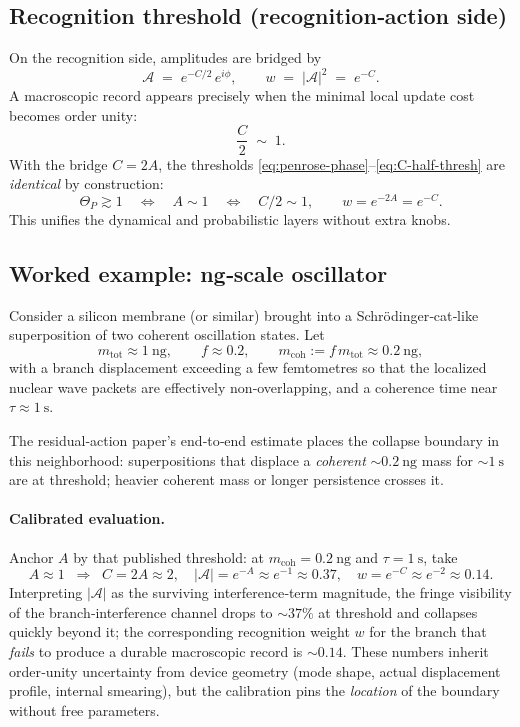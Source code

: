 \documentclass[11pt,letterpaper]{article}
\theoremstyle{definition}
\begin{document}
\subsection{Recognition threshold (recognition‑action side)}

On the recognition side, amplitudes are bridged by
\begin{equation}
\mathcal A \;=\;e^{-C/2}\,e^{i\phi},
\qquad 
w\;=\;|\mathcal A|^2\;=\;e^{-C}.
\end{equation}
A macroscopic record appears precisely when the minimal local update cost becomes order unity:
\begin{equation}
\frac{C}{2}\;\sim\;1.
\label{eq:C-half-thresh}
\end{equation}
With the bridge $C=2A$, the thresholds \eqref{eq:penrose-phase}--\eqref{eq:C-half-thresh} are \emph{identical} by construction:
\begin{equation}
\Theta_P\gtrsim 1 
\quad\Longleftrightarrow\quad 
A\sim 1
\quad\Longleftrightarrow\quad 
C/2\sim 1,
\qquad 
w=e^{-2A}=e^{-C}.
\end{equation}
This unifies the dynamical and probabilistic layers without extra knobs.

\subsection{Worked example: ng‑scale oscillator}

Consider a silicon membrane (or similar) brought into a Schr\"odinger‑cat‑like superposition of two coherent oscillation states. Let
\[
m_{\mathrm{tot}}\approx 1~\mathrm{ng},\qquad f\approx 0.2,\qquad 
m_{\mathrm{coh}}:=f\,m_{\mathrm{tot}}\approx 0.2~\mathrm{ng},
\]
with a branch displacement exceeding a few femtometres so that the localized nuclear wave packets are effectively non‑overlapping, and a coherence time near $\tau\approx 1~\mathrm{s}$.

The residual‑action paper’s end‑to‑end estimate places the collapse boundary in this neighborhood: superpositions that displace a \emph{coherent} $\sim 0.2~\mathrm{ng}$ mass for $\sim 1~\mathrm{s}$ are at threshold; heavier coherent mass or longer persistence crosses it. %
\paragraph{Calibrated evaluation.}
Anchor $A$ by that published threshold: at $m_{\mathrm{coh}}=0.2~\mathrm{ng}$ and $\tau=1~\mathrm{s}$, take
\[
A \approx 1\;\;\Rightarrow\;\; C=2A\approx 2,\quad 
|\mathcal A|=e^{-A}\approx e^{-1}\approx 0.37,\quad 
w=e^{-C}\approx e^{-2}\approx 0.14.
\]
Interpreting $|\mathcal A|$ as the surviving interference‑term magnitude, the fringe visibility of the branch‑interference channel drops to $\sim 37\%$ at threshold and collapses quickly beyond it; the corresponding recognition weight $w$ for the branch that \emph{fails} to produce a durable macroscopic record is $\sim 0.14$. These numbers inherit order‑unity uncertainty from device geometry (mode shape, actual displacement profile, internal smearing), but the calibration pins the \emph{location} of the boundary without free parameters. %
\end{document}
